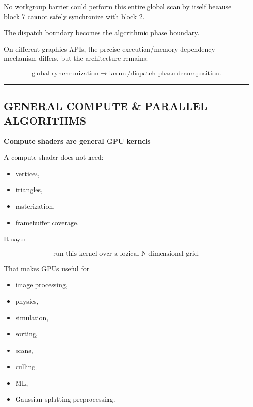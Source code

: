 No workgroup barrier could perform this entire global scan by itself because block 7 cannot safely synchronize with block 2.

The dispatch boundary becomes the algorithmic phase boundary.

On different graphics APIs, the precise execution/memory dependency mechanism differs, but the architecture remains:

\[
\boxed{
\text{global synchronization}
\Rightarrow
\text{kernel/dispatch phase decomposition}.
}
\]

\begin{center}\rule{0.5\linewidth}{0.5pt}\end{center}

\subsection{GENERAL COMPUTE \& PARALLEL ALGORITHMS}\label{03-visual-computing-i-ch016-general-compute-parallel-algorithms}

\hypertarget{03-visual-computing-i-ch016-general-compute-parallel-algorithms}{}

\textbf{Compute shaders are general GPU kernels}

A compute shader does not need:

\begin{itemize}
\tightlist
\item
  vertices,
\item
  triangles,
\item
  rasterization,
\item
  framebuffer coverage.
\end{itemize}

It says:

\[
\boxed{
\text{run this kernel over a logical N-dimensional grid}.
}
\]

That makes GPUs useful for:

\begin{itemize}
\tightlist
\item
  image processing,
\item
  physics,
\item
  simulation,
\item
  sorting,
\item
  scans,
\item
  culling,
\item
  ML,
\item
  Gaussian splatting preprocessing.
\end{itemize}

